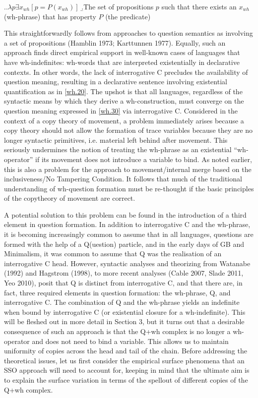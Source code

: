 \documentclass[charis]{glossa}
\begin{document}
\ex.\label{wh.30}\a.$\lambda p\exists x_{wh}[p = P(x_{wh})]$
   \b.The set of propositions $p$ such that there exists an $x_{wh}$ (wh-phrase) that has property $P$ (the predicate)

This straightforwardly follows from approaches to question semantics as involving a set of propositions (Hamblin 1973; Karttunnen 1977).  Equally, such an approach finds direct empirical support in well-known cases of languages that have wh-indefinites: wh-words that are interpreted existentially in declarative contexts. In other words, the lack of interrogative C precludes the availability of question meaning, resulting in a declarative sentence involving existential quantification as in \ref{wh.20}. The upshot is that all languages, regardless of the syntactic means by which they derive a wh-construction, must converge on the question meaning expressed in \ref{wh.30} via interrogative C. Considered in the context of a copy theory of movement, a problem immediately arises because a copy theory should not allow the formation of trace variables because they are no longer syntactic primitives, i.e. material left behind after movement. This seriously undermines the notion of treating the wh-phrase as an existential ``wh-operator'' if its movement does not introduce a variable to bind.  As noted earlier, this is also a problem for the approach to movement/internal merge based on the inclusiveness/No Tampering Condition.  It follows that much of the traditional understanding of wh-question formation must be re-thought if the basic principles of the copytheory of movement are correct.

A potential solution to this problem can be found in the introduction of a third element in question formation. In addition to interrogative C and the wh-phrase, it is becoming increasingly common to assume that in all languages, questions are formed with the help of a Q(uestion) particle, and in the early days of GB and Minimalism, it was common to assume that Q was the realisation of an interrogative C head. However, syntactic analyses and theorizing from Watanabe (1992) and Hagstrom (1998), to more recent analyses (Cable 2007, Slade 2011, Yeo 2010), posit that Q is distinct from interrogative C, and that there are, in fact, three required elements in question formation: the wh-phrase, Q, and interrogative C. The combination of Q and the wh-phrase yields an indefinite when bound by interrogative C (or existential closure for a wh-indefinite). This will be fleshed out in more detail in Section 3, but it turns out that a desirable consequence of such an approach is that the Q+wh complex is no longer a wh-operator and does not need to bind a variable. This allows us to maintain uniformity of copies across the head and tail of the chain. Before addressing the theoretical issues, let us first consider the empirical surface phenomena that an SSO approach will need to account for, keeping in mind that the ultimate aim is to explain the surface variation in terms of the spellout of different copies of the Q+wh complex.
\end{document}
